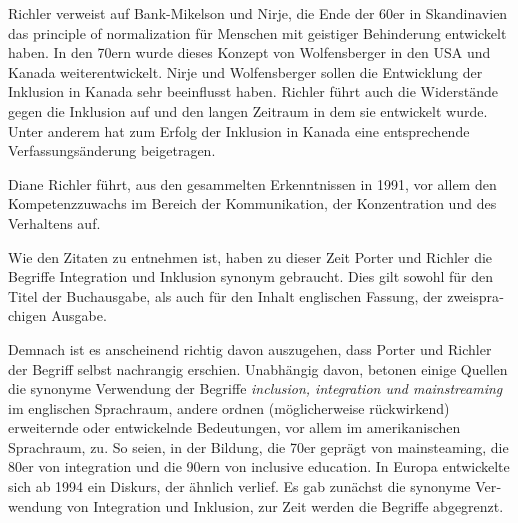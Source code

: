 Richler verweist auf Bank-Mikelson und Nirje, die Ende der 60er in Skandinavien das principle of normalization für Menschen mit geistiger Behinderung entwickelt haben. In den 70ern wurde dieses Konzept von Wolfensberger in den USA und Kanada weiterentwickelt. Nirje und Wolfensberger sollen die Entwicklung der Inklusion in Kanada sehr beeinflusst haben.
Richler führt auch die Widerstände gegen die Inklusion auf und den langen Zeitraum in dem sie entwickelt wurde.
Unter anderem hat zum Erfolg der In­klusion in Kanada eine entsprechende Verfassungsänderung beigetragen.  

Diane Richler führt, aus den gesammelten Erkenntnissen in 1991, vor allem den Kom­pe­tenz­zuwachs im Bereich der Kommunikation, der Konzentration und des Verhaltens auf.

Wie den Zitaten zu entnehmen ist, haben zu dieser Zeit Porter und Richler die Begriffe In­te­gration und Inklusion synonym gebraucht. Dies gilt sowohl für den Titel der Buchausgabe, als auch für den Inhalt englischen Fassung, der zwei­spra­ch­igen Ausgabe. 

Demnach ist es anscheinend richtig davon auszugehen, dass Porter und Richler der Begriff selbst nachrangig erschien. Unabhängig davon, betonen einige Quellen die synonyme Verwendung der Begriffe \textit{inclusion, integration und mainstreaming} im englischen Sprachraum, andere ordnen (möglicherweise rückwirkend) erweiternde oder entwickelnde Bedeutungen, vor allem im amerikanischen Sprachraum, zu. So seien, in der Bildung, die 70er geprägt von mainsteaming, die 80er von integration und die 90ern von inclusive education. In Europa ent­wickelte sich ab 1994 ein Diskurs, der ähnlich verlief. Es gab zunächst die synonyme Ver­wen­dung von Integration und Inklusion, zur Zeit werden die Begriffe abgegrenzt.  
